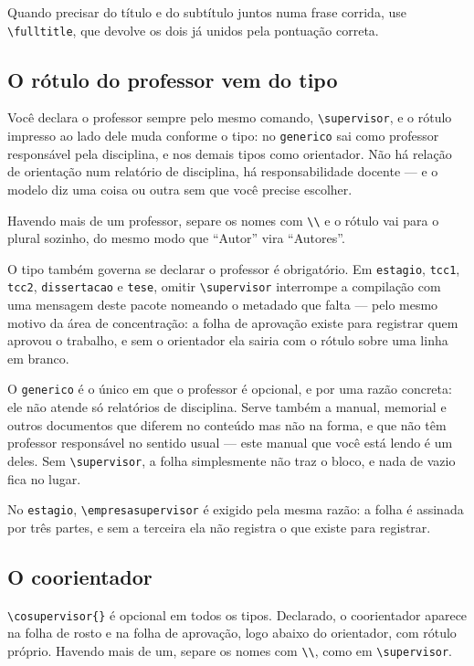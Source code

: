 Quando precisar do título e do subtítulo juntos numa frase corrida, use \verb|\fulltitle|, que
devolve os dois já unidos pela pontuação correta.

\subsection{O rótulo do professor vem do tipo}\label{ssc:rotulo-professor}

Você declara o professor sempre pelo mesmo comando, \verb|\supervisor|, e o rótulo impresso ao lado
dele muda conforme o tipo: no \texttt{generico} sai como professor responsável pela disciplina, e
nos demais tipos como orientador. Não há relação de orientação num relatório de disciplina, há
responsabilidade docente --- e o modelo diz uma coisa ou outra sem que você precise escolher.

Havendo mais de um professor, separe os nomes com \verb|\\| e o rótulo vai para o plural sozinho,
do mesmo modo que ``Autor'' vira ``Autores''.

O tipo também governa se declarar o professor é obrigatório. Em \texttt{estagio},
\texttt{tcc1}, \texttt{tcc2}, \texttt{dissertacao} e \texttt{tese}, omitir \verb|\supervisor|
interrompe a compilação com uma mensagem deste pacote nomeando o metadado que falta --- pelo mesmo
motivo da área de concentração: a folha de aprovação existe para registrar quem aprovou o trabalho,
e sem o orientador ela sairia com o rótulo sobre uma linha em branco.

O \texttt{generico} é o único em que o professor é opcional, e por uma razão concreta: ele não
atende só relatórios de disciplina. Serve também a manual, memorial e outros documentos que diferem
no conteúdo mas não na forma, e que não têm professor responsável no sentido usual --- este manual
que você está lendo é um deles. Sem \verb|\supervisor|, a folha simplesmente não traz o bloco, e
nada de vazio fica no lugar.

No \texttt{estagio}, \verb|\empresasupervisor| é exigido pela mesma razão: a folha é assinada por
três partes, e sem a terceira ela não registra o que existe para registrar.

\subsection{O coorientador}\label{ssc:coorientador}

\verb|\cosupervisor{}| é opcional em todos os tipos. Declarado, o coorientador aparece na folha de
rosto e na folha de aprovação, logo abaixo do orientador, com rótulo próprio. Havendo mais de um,
separe os nomes com \verb|\\|, como em \verb|\supervisor|.

